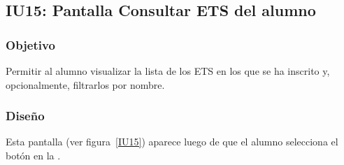 \subsection{IU15: Pantalla Consultar ETS del alumno}

\label{IU15}
\newpage

\subsubsection{Objetivo}
Permitir al alumno visualizar la lista de los ETS en los que se ha inscrito y, opcionalmente, filtrarlos por nombre.

\subsubsection{Diseño}
Esta pantalla  (ver figura~\ref{IU15}) aparece luego de que el alumno selecciona el botón  en la .


